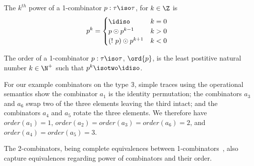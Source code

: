 \begin{definition}
  The $k^{th}$ power of a 1-combinator $p : \tau \iso \tau$, for
  $k \in \Z$ is
  \[
    p^k =
  \begin{cases}
    \idiso & k = 0 \\
    p \odot p^{k - 1} & k > 0 \\
    (!~p) \odot p^{k + 1} & k < 0 \\
  \end{cases}
  \]
\end{definition}

\begin{definition}
  The order of a 1-combinator $p : \tau \iso \tau$, $\ord{p}$, is the
  least postitive natural number $k \in \N^+$ such that
  $p^k \isotwo \idiso$.
\end{definition}

For our example combinators on the type $\mathbb{3}$, simple traces
using the operational semantics show the combinator $a_1$ is the
identity permutation; the combinators $a_3$ and $a_6$ swap two of the
three elements leaving the third intact; and the combinators $a_4$ and
$a_5$ rotate the three elements. We therefore have
$\mathit{order}(a_1)=1$,
$\mathit{order}(a_2)=\mathit{order}(a_3)=\mathit{order}(a_6)=2$, and
$\mathit{order}(a_4)=\mathit{order}(a_5)=3$.



The 2-combinators, being complete equivalences between
1-combinators~\cite{Carette2016}, also capture equivalences regarding
power of combinators and their order.


